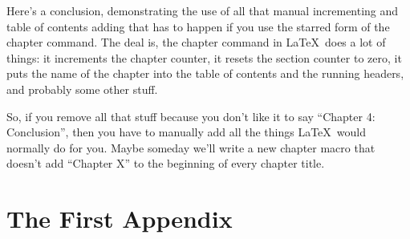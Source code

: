 \documentclass[12pt,twoside]{reedthesis}
\begin{document}
Here's a conclusion, demonstrating the use of all that manual incrementing and table of contents adding that has to happen if you use the starred form of the chapter command. The deal is, the chapter command in \LaTeX\ does a lot of things: it increments the chapter counter, it resets the section counter to zero, it puts the name of the chapter into the table of contents and the running headers, and probably some other stuff.

So, if you remove all that stuff because you don't like it to say ``Chapter 4: Conclusion'', then you have to manually add all the things \LaTeX\ would normally do for you. Maybe someday we'll write a new chapter macro that doesn't add ``Chapter X'' to the beginning of every chapter title.


    \appendix
      \chapter{The First Appendix}



  \backmatter %

    \nocite{*}


%  
 

\end{document}
